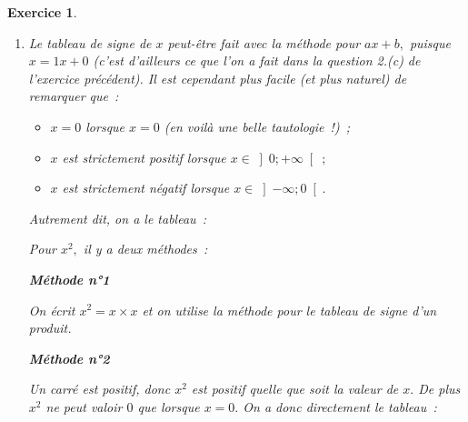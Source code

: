 \documentclass[10pt]{article}
\newtheorem{exo}{Exercice}
\begin{document}
\begin{exo}

\begin{enumerate}
\item Le tableau de signe de $x$ peut-être fait avec la méthode pour $ax+b,$ puisque $x=1x+0$ (c'est d'ailleurs ce que l'on a fait dans la question 2.(c) de l'exercice précédent). Il est cependant plus facile (et plus naturel) de remarquer que~:

\begin{itemize}
\item[\textbullet] $x=0$ lorsque $x=0$ (en voilà une belle tautologie~!)~;
\item[\textbullet] $x$ est strictement positif lorsque $x\in\left]0;+\infty\right[~;$
\item[\textbullet] $x$ est strictement négatif lorsque $x\in\left]-\infty;0\right[.$
\end{itemize}

Autrement dit, on a le tableau~:

\medskip
\begin{center}
\end{center}

\medskip

Pour $x^2,$ il y a deux méthodes~:

\setlength{\columnseprule}{1pt}

\begin{multicols}{2}

\textbf{Méthode n°1}

On écrit $x^2=x\times x$ et on utilise la méthode pour le tableau de signe d'un produit.

\begin{center}
\end{center}

\columnbreak

\textbf{Méthode n°2}

Un carré est positif, donc $x^2$ est positif quelle que soit la valeur de $x.$ De plus $x^2$ ne peut valoir $0$ que lorsque $x=0.$ On a donc directement le tableau~:


\end{multicols}
\end{enumerate}
\end{exo}
\end{document}
